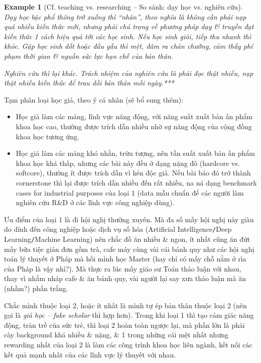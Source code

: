\documentclass[12pt]{article}
\newtheorem{example}{Example}
\begin{document}
\begin{example}[Cf. teaching vs. researching -- So sánh: dạy học vs. nghiên cứu]
	Dạy học bậc phổ thông trở xuống thì ``nhàn'', theo nghĩa là không cần phải nạp quá nhiều kiến thức mới, nhưng phải chú trọng về phương pháp dạy \& truyền đạt kiến thức 1 cách hiệu quả tới các học sinh. Nếu học sinh giỏi, tiếp thu nhanh thì khỏe. Gặp học sinh dốt hoặc đầu gấu thì mệt, đâm ra chán chường, cảm thấy phí phạm thời gian \& nguồn sức lực hạn chế của bản thân.
	
	Nghiên cứu thì lại khác. Trách nhiệm của nghiên cứu là phải đọc thật nhiều, nạp thật nhiều kiến thức để trau dồi bản thân mỗi ngày.***
\end{example}
Tạm phân loại học giả, theo ý cá nhân (sẽ bổ sung thêm):
\begin{itemize}
	\item Học giả làm các mảng, lĩnh vực năng động, với năng suất xuất bản ấn phẩm khoa học cao, thường được trích dẫn nhiều nhờ sự năng động của cộng đồng khoa học tương ứng.
	\item Học giả làm các mảng khó nhằn, trừu tượng, nên tần suất xuất bản ấn phẩm khoa học khá thấp, nhưng các bài này đều ở dạng nặng đô (hardcore vs. softcore), thường ít được trích dẫn vì kén độc giả. Nếu bài báo đó trở thành cornerstone thì lại được trích dẫn nhiều đến rất nhiều, na ná dạng benchmark cases for industrial purposes của loại 1 (data mẫu chuẩn để các người làm nghiên cứu R\&D ở các lĩnh vực công nghiệp dùng).
\end{itemize}
Ưu điểm của loại 1 là đi hội nghị thường xuyên. Mà đa số mấy hội nghị này giàu do dính đến công nghiệp hoặc dịch vụ số hóa (Artificial Intelligence{\tt/}Deep Learning{\tt/}Machine Learning) nên chắc đồ ăn nhiều \& ngon, ít nhất cũng ăn đứt mấy bữa tiệc giản đơn gồm trà, cafe máy cùng vài cái bánh quy như các hội nghị toán lý thuyết ở Pháp mà hồi mình học Master (hay chỉ có mấy chỗ nằm ở rìa của Pháp là vậy nhỉ?). Mà thực ra lúc mấy giáo sư Toán thảo luận với nhau, thay vì nhắm nháp cafe \& ăn bánh quy, vài người lại say xưa thảo luận mà ăn (nhầm?) phấn trắng.

Chắc mình thuộc loại 2, hoặc ít nhất là mình tự ép bản thân thuộc loại 2 (nên gọi là {\it giả học -- fake scholar} thì hợp hơn). Trong khi loại 1 thì tạo cảm giác năng động, tràn trề của sức trẻ, thì loại 2 hoàn toàn ngược lại, mà phần lớn là phải cày background khá nhiều \& nặng, \& 1 trong những cái mệt nhất nhưng rewarding nhất của loại 2 là làm các công trình khoa học liên ngành, kết nối các kết quả mạnh nhất của các lĩnh vực lý thuyết với nhau.
\end{document}
